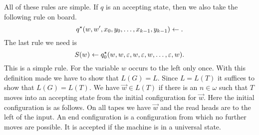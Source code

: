 All of these rules are simple. If $q$ is an accepting state,
then we also take the following rule on board.
\begin{equation}
q^{\star}(w,w',x_0, y_0, \dotsc, x_{k-1}, y_{k-1}) \leftarrow .
\end{equation}
The last rule we need is
\begin{equation}
S(w) \leftarrow q_0^{\star}(w, w, \varepsilon,
    w, \varepsilon, w, \dotsc, \varepsilon, w).
\end{equation}
This is a simple rule. For the variable $w$ occurs to the
left only once. With this definition made we have to show
that $L(G) = L$. Since $L = L(T)$ it suffices to show
that $L(G) = L(T)$. We have $\vec{w} \in L(T)$ if
there is an $n \in \omega$ such that $T$ moves into an
accepting state from the initial configuration for
$\vec{w}$. Here the initial configuration is as follows.
On all tapes we have $\vec{w}$ and the read heads are
to the left of the input. An end configuration is a
configuration from which no further moves are possible.
It is accepted if the machine is in a universal state.

